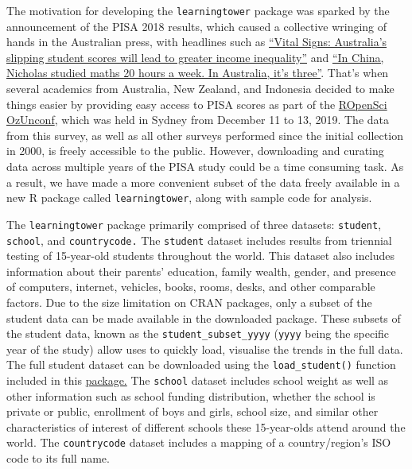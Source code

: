 The motivation for developing the \texttt{learningtower} package was
sparked by the announcement of the PISA 2018 results, which caused a
collective wringing of hands in the Australian press, with headlines
such as
\href{https://theconversation.com/vital-signs-australias-slipping-student-scores-will-lead-to-greater-income-inequality-128301}{``Vital
Signs: Australia's slipping student scores will lead to greater income
inequality''} and
\href{https://www.smh.com.au/education/in-china-nicholas-studied-maths-20-hours-a-week-in-australia-it-s-three-20191203-p53ggv.html}{``In
China, Nicholas studied maths 20 hours a week. In Australia, it's
three''}. That's when several academics from Australia, New Zealand, and
Indonesia decided to make things easier by providing easy access to PISA
scores as part of the \href{https://ozunconf19.ropensci.org/}{ROpenSci
OzUnconf}, which was held in Sydney from December 11 to 13, 2019. The
data from this survey, as well as all other surveys performed since the
initial collection in 2000, is freely accessible to the public. However,
downloading and curating data across multiple years of the PISA study
could be a time consuming task. As a result, we have made a more
convenient subset of the data freely available in a new R package called
\texttt{learningtower}, along with sample code for analysis.

The \texttt{learningtower} package primarily comprised of three
datasets: \texttt{student}, \texttt{school}, and \texttt{countrycode.}
The \texttt{student} dataset includes results from triennial testing of
15-year-old students throughout the world. This dataset also includes
information about their parents' education, family wealth, gender, and
presence of computers, internet, vehicles, books, rooms, desks, and
other comparable factors. Due to the size limitation on CRAN packages,
only a subset of the student data can be made available in the
downloaded package. These subsets of the student data, known as the
\texttt{student\_subset\_yyyy} (\texttt{yyyy} being the specific year of
the study) allow uses to quickly load, visualise the trends in the full
data. The full student dataset can be downloaded using the
\texttt{load\_student()} function included in this
\href{https://kevinwang09.github.io/learningtower/}{package.} The
\texttt{school} dataset includes school weight as well as other
information such as school funding distribution, whether the school is
private or public, enrollment of boys and girls, school size, and
similar other characteristics of interest of different schools these
15-year-olds attend around the world. The \texttt{countrycode} dataset
includes a mapping of a country/region's ISO code to its full name.


